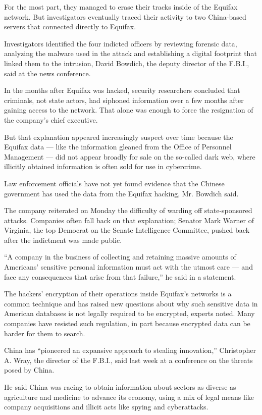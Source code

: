 For the most part, they managed to erase their tracks inside of the
Equifax network. But investigators eventually traced their activity to
two China-based servers that connected directly to Equifax.

Investigators identified the four indicted officers by reviewing
forensic data, analyzing the malware used in the attack and establishing
a digital footprint that linked them to the intrusion, David Bowdich,
the deputy director of the F.B.I., said at the news conference.

In the months after Equifax was hacked, security researchers concluded
that criminals, not state actors, had siphoned information over a few
months after gaining access to the network. That alone was enough to
force the resignation of the company's chief executive.

But that explanation appeared increasingly suspect over time because the
Equifax data --- like the information gleaned from the Office of
Personnel Management --- did not appear broadly for sale on the
so-called dark web, where illicitly obtained information is often sold
for use in cybercrime.

Law enforcement officials have not yet found evidence that the Chinese
government has used the data from the Equifax hacking, Mr. Bowdich said.

The company reiterated on Monday the difficulty of warding off
state-sponsored attacks. Companies often fall back on that explanation;
Senator Mark Warner of Virginia, the top Democrat on the Senate
Intelligence Committee, pushed back after the indictment was made
public.

``A company in the business of collecting and retaining massive amounts
of Americans' sensitive personal information must act with the utmost
care --- and face any consequences that arise from that failure,'' he
said in a statement.

The hackers' encryption of their operations inside Equifax's networks is
a common technique and has raised new questions about why such sensitive
data in American databases is not legally required to be encrypted,
experts noted. Many companies have resisted such regulation, in part
because encrypted data can be harder for them to search.

China has ``pioneered an expansive approach to stealing innovation,''
Christopher A. Wray, the director of the F.B.I., said last week at a
conference on the threats posed by China.

He said China was racing to obtain information about sectors as diverse
as agriculture and medicine to advance its economy, using a mix of legal
means like company acquisitions and illicit acts like spying and
cyberattacks.

